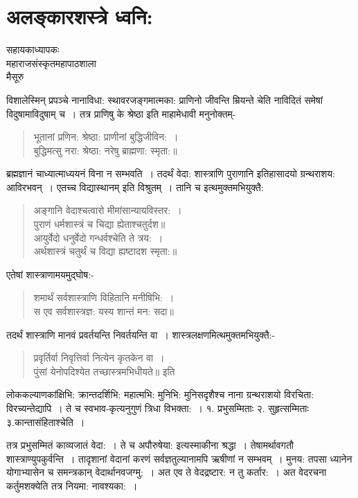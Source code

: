 {\fontsize{15}{17}\selectfont
\chapter{अलङ्कारशस्त्रे ध्वनि:}

\begin{center}
\smallskip
सहायकाध्यापकः\\
महाराजसंस्कृतमहापाठशाला\\
मैसूरु
\addrule
\end{center}
विशालेस्मिन् प्रपञ्चे नानाविधा: स्थावरजङ्गमात्मका: प्राणिनो जीवन्ति म्रियन्ते चेति नाविदितं समेषां विदुषामाविदुषाम् च~। तत्र प्राणिषु के श्रेष्ठा इति माहामेधावी मनुनोक्तम्-
\begin{verse}
भूतानां प्रणिन: श्रेष्ठा: प्राणीनां बुद्धिजीविन:~। \\
बुद्धिमत्सु नरा: श्रेष्ठा: नरेषु ब्राह्मणा: स्मृता:॥
\end{verse}
ब्रह्मज्ञानं चाध्यात्माध्ययनं विना न सम्भवति~। तदर्थं वेदा: शास्त्राणि पुराणानि इतिहासादयो ग्रन्थराशय: आविरभवन्~। एतच्च विद्यास्थानम् इति विश्रुतम्~। तानि च इत्थमुक्तमभियुक्तै: 
\begin{verse}
अङ्गानि वेदाश्चत्वारो मीमांसान्यायविस्तर:~। \\
पुराणं धर्मशास्त्रं च चिद्या ह्येताश्चतुर्दश॥\\
आयुर्वेदो धनुर्वेदो गन्धर्वश्चेति ते त्रय:~। \\
अर्थशास्त्रं चतुर्थं च विद्या ह्यष्टादश स्मृता:॥
\end{verse}
एतेषां शास्त्राणामयमुद्घोष:-
\begin{verse}
शमार्थं सर्वशास्त्राणि विहितानि मनीषिभि:~। \\
स एव सर्वशास्त्रज्ञ: यस्य शान्तं मन: सदा॥
\end{verse}
तदर्थं शास्त्राणि मानवं प्रवर्तयन्ति निवर्तयन्ति वा~। शास्त्रलक्षणमित्थमुक्तमभियुक्तै:-
\begin{verse}
प्रवृर्तिर्वा निवृत्तिर्वा नित्येन कृतकेन वा~। \\
पुंसां येनोपदिश्येत तच्छास्त्रमभिधीयते॥ इति
\end{verse}
लोककल्याणकांक्षिभि: क्रान्तदर्शिभि: महात्मभि: मुनिभि: मुनिसदृशैश्च नाना ग्रन्थराशयो विरचिता: विरच्यन्तेद्यापि~। ते च स्वभाव-कृत्यनुगुणं त्रिधा विभक्ता:~। १. प्रभुसम्मिताः   २. सुहृत्सम्मिताः  ३.कान्तासंहिताश्चेति~। 

तत्र प्रभुसम्मितं काव्यजातं वेदा:~। ते च अपौरुषेया: इत्यस्माकीना श्रद्धा~। तेषामर्थावगतौ शास्त्राण्युपकुर्वन्ति~। तादृशानां वेदानां करणं सर्वज्ञतुल्यानामपि ऋषीणां न सम्भवम्~। मुनय: तपसा ध्यानेन योगाभ्यासेन च समन्त्रकान् वेदार्थानवजग्मु:~। अत एव ते वेदद्रष्टार: न तु कर्तार:~। अत वेदरचना कर्तुमशक्येति तत्र नियमा: नावश्यका:~। 

}
